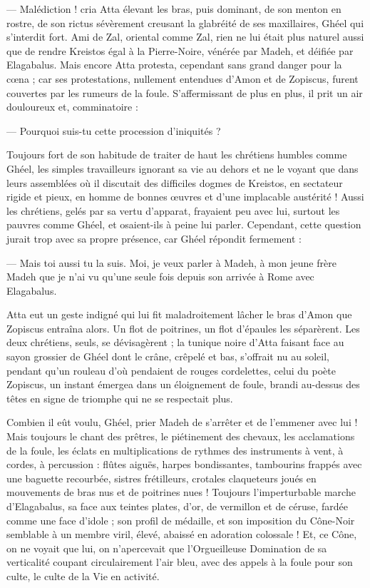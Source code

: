 \documentclass[a4paper, 11pt, oneside, polutonikogreek, french]{article}
\begin{document}
--- Malédiction ! cria Atta élevant les bras, puis dominant, de son menton en rostre, de son rictus sévèrement creusant la glabréité de ses maxillaires, Ghéel qui s'interdit fort. Ami de Zal, oriental comme Zal, rien ne lui était plus naturel aussi que de rendre Kreistos égal à la Pierre-Noire, vénérée par Madeh, et déifiée par Elagabalus. Mais encore Atta protesta, cependant sans grand danger pour la cœna ; car ses protestations, nullement entendues d'Amon et de Zopiscus, furent couvertes par les rumeurs de la foule. S'affermissant de plus en plus, il prit un air douloureux et, comminatoire :

--- Pourquoi suis-tu cette procession d'iniquités ?

Toujours fort de son habitude de traiter de haut les chrétiens humbles comme Ghéel, les simples travailleurs ignorant sa vie au dehors et ne le voyant que dans leurs assemblées où il discutait des difficiles dogmes de Kreistos, en sectateur rigide et pieux, en homme de bonnes œuvres et d'une implacable austérité ! Aussi les chrétiens, gelés par sa vertu d'apparat, frayaient peu avec lui, surtout les pauvres comme Ghéel, et osaient-ils à peine lui parler. Cependant, cette question jurait trop avec sa propre présence, car Ghéel répondit fermement :

--- Mais toi aussi tu la suis. Moi, je veux parler à Madeh, à mon jeune frère Madeh que je n'ai vu qu'une seule fois depuis son arrivée à Rome avec Elagabalus.

Atta eut un geste indigné qui lui fit maladroitement lâcher le bras d'Amon que Zopiscus entraîna alors. Un flot de poitrines, un flot d'épaules les séparèrent. Les deux chrétiens, seuls, se dévisagèrent ; la tunique noire d'Atta faisant face au sayon grossier de Ghéel dont le crâne, crêpelé et bas, s'offrait nu au soleil, pendant qu'un rouleau d'où pendaient de rouges cordelettes, celui du poète Zopiscus, un instant émergea dans un éloignement de foule, brandi au-dessus des têtes en signe de triomphe qui ne se respectait plus.

Combien il eût voulu, Ghéel, prier Madeh de s'arrêter et de l'emmener avec lui ! Mais toujours le chant des prêtres, le piétinement des chevaux, les acclamations de la foule, les éclats en multiplications de rythmes des instruments à vent, à cordes, à percussion : flûtes aiguës, harpes bondissantes, tambourins frappés avec une baguette recourbée, sistres frétilleurs, crotales claqueteurs joués en mouvements de bras nus et de poitrines nues ! Toujours l'imperturbable marche d'Elagabalus, sa face aux teintes plates, d'or, de vermillon et de céruse, fardée comme une face d'idole ; son profil de médaille, et son imposition du Cône-Noir semblable à un membre viril, élevé, abaissé en adoration colossale ! Et, ce Cône, on ne voyait que lui, on n'apercevait que l'Orgueilleuse Domination de sa verticalité coupant circulairement l'air bleu, avec des appels à la foule pour son culte, le culte de la Vie en activité.
\end{document}
